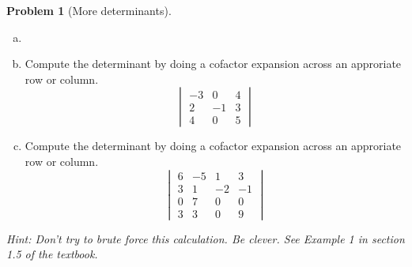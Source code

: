 \documentclass[10pt]{article}
\theoremstyle{definition}
\newtheorem{problem}[theorem]{Problem}
\newcommand{\1}[1]{\textbf{1}_{\left[#1\right]}} %
\begin{document}
\begin{problem}[More determinants]
  \begin{enumerate}[(a)]
    \item[]
    \item Compute the determinant by doing a cofactor expansion across an
    approriate row or column.
    \begin{equation*}
      \begin{vmatrix}
        -3&0&4\\
        2&-1&3\\
        4&0&5
      \end{vmatrix}
    \end{equation*}
    \item Compute the determinant by doing a cofactor expansion across an
    approriate row or column.
    \begin{equation*}
      \begin{vmatrix}
        6&-5&1&3\\
        3&1&-2&-1\\
        0&7&0&0\\
        3&3&0&9
      \end{vmatrix}
    \end{equation*}
    
  \end{enumerate}
  \textit{Hint: Don't try to brute force this calculation. Be clever. See
    Example 1 in section 1.5 of the textbook.}
\end{problem}
\end{document}
